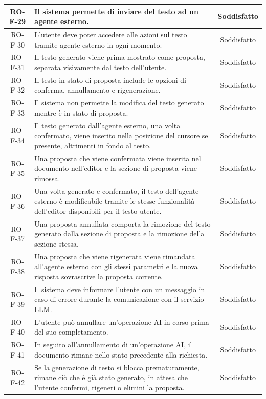 \documentclass[11pt,a4paper]{article}
\begin{document}
\begin{longtable}{|c|p{11cm}|c|}
\hline
RO-F-29 & Il sistema permette di inviare del testo ad un agente esterno. & Soddisfatto \\
\hline
RO-F-30 & L'utente deve poter accedere alle azioni sul testo tramite agente esterno in ogni momento. & Soddisfatto \\
\hline
RO-F-31 & Il testo generato viene prima mostrato come proposta, separata visivamente dal testo dell'utente. & Soddisfatto \\
\hline
RO-F-32 & Il testo in stato di proposta include le opzioni di conferma, annullamento e rigenerazione. & Soddisfatto \\
\hline
RO-F-33 & Il sistema non permette la modifica del testo generato mentre è in stato di proposta. & Soddisfatto \\
\hline
RO-F-34 & Il testo generato dall'agente esterno, una volta confermato, viene inserito nella posizione del cursore se presente, altrimenti in fondo al testo. & Soddisfatto \\
\hline
RO-F-35 & Una proposta che viene confermata viene inserita nel documento nell'editor e la sezione di proposta viene rimossa. & Soddisfatto \\
\hline
RO-F-36 & Una volta generato e confermato, il testo dell'agente esterno è modificabile tramite le stesse funzionalità dell'editor disponibili per il testo utente. & Soddisfatto \\
\hline
RO-F-37 & Una proposta annullata comporta la rimozione del testo generato dalla sezione di proposta e la rimozione della sezione stessa. & Soddisfatto \\
\hline
RO-F-38 & Una proposta che viene rigenerata viene rimandata all'agente esterno con gli stessi parametri e la nuova risposta sovrascrive la proposta corrente. & Soddisfatto \\
\hline
RO-F-39 & Il sistema deve informare l'utente con un messaggio in caso di errore durante la comunicazione con il servizio LLM. & Soddisfatto \\
\hline
RO-F-40 & L'utente può annullare un'operazione AI in corso prima del suo completamento. & Soddisfatto \\
\hline
RO-F-41 & In seguito all'annullamento di un'operazione AI, il documento rimane nello stato precedente alla richiesta. & Soddisfatto \\
\hline
RO-F-42 & Se la generazione di testo si blocca prematuramente, rimane ciò che è già stato generato, in attesa che l'utente confermi, rigeneri o elimini la proposta. & Soddisfatto \\

\end{longtable}
\end{document}

